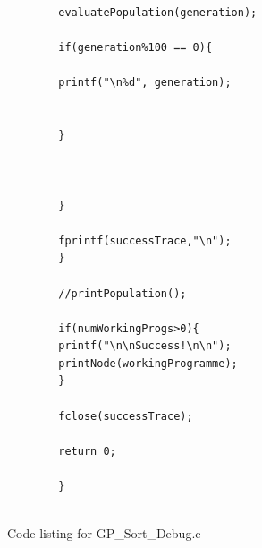\documentclass{article}
\begin{document}
\begin{lstlisting}
	    evaluatePopulation(generation);
	    
	    if(generation%100 == 0){
	    
	    printf("\n%d", generation);
	    
	    
	    }
	    
	    
	    
	    }
	    
	    fprintf(successTrace,"\n");
	    }
	    
	    //printPopulation();
	    
	    if(numWorkingProgs>0){
	    printf("\n\nSuccess!\n\n");
	    printNode(workingProgramme);
	    }
	    
	    fclose(successTrace);
	    
	    return 0;
	    
	    }
	    
	    \end{lstlisting}
	    
	    Code listing for GP\_Sort\_Debug.c
	    
\end{document}
